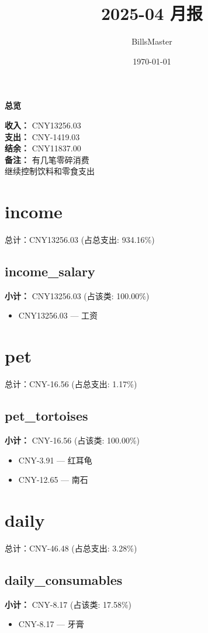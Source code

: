 \documentclass[12pt]{article}
\title{2025-04 月报}
\author{BillsMaster}
\date{\today}
\begin{document}
\maketitle

\vspace{1em}
\hrulefill
\begin{center}
    {\Large\bfseries 总览}\par\vspace{1em}
    {\large
    \textbf{收入：} CNY13256.03\\
    \textbf{支出：} CNY-1419.03\\
    \textbf{结余：} CNY11837.00\\
    \textbf{备注：} 有几笔零碎消费\\
    继续控制饮料和零食支出
    }
\end{center}
\hrulefill

\section*{income}
总计：CNY13256.03 	 (占总支出: 934.16\%)

\subsection*{income\_salary}
\textbf{小计：} CNY13256.03 (占该类: 100.00\%)
\begin{itemize}
    \item CNY13256.03 --- 工资
\end{itemize}
\section*{pet}
总计：CNY-16.56 	 (占总支出: 1.17\%)

\subsection*{pet\_tortoises}
\textbf{小计：} CNY-16.56 (占该类: 100.00\%)
\begin{itemize}
    \item CNY-3.91 --- 红耳龟
    \item CNY-12.65 --- 南石
\end{itemize}
\section*{daily}
总计：CNY-46.48 	 (占总支出: 3.28\%)

\subsection*{daily\_consumables}
\textbf{小计：} CNY-8.17 (占该类: 17.58\%)
\begin{itemize}
    \item CNY-8.17 --- 牙膏
\end{itemize}
\end{document}

